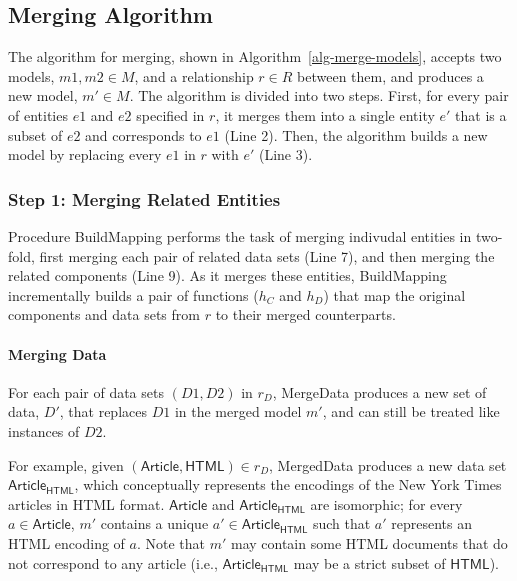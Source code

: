 \subsection{Merging Algorithm}

The algorithm for merging, shown in Algorithm~\ref{alg-merge-models},
accepts two models, $m1, m2 \in M$, and a relationship $r \in R$
between them, and produces a new model, $m' \in M$. The algorithm is
divided into two steps. First, for every pair of entities $e1$ and
$e2$ specified in $r$, it merges them into a single entity $e'$ that is a
subset of $e2$ and corresponds to $e1$ (Line 2). Then, the algorithm
builds a new model by replacing every $e1$ in $r$ with $e'$ (Line 3).


\subsubsection{Step 1: Merging Related Entities}

Procedure \textsf{BuildMapping} performs the task of merging indivudal
entities in two-fold, first merging each pair of related data sets
(Line 7), and then merging the related components (Line 9). As it
merges these entities, \textsf{BuildMapping} incrementally builds a
pair of functions ($h_{C}$ and $h_{D}$) that map the original
components and data sets from $r$ to their merged counterparts.


\paragraph{\textbf{Merging Data}} For each pair of data sets $(D1,
D2)$ in $r_{D}$, \textsf{MergeData} produces a new set of data, $D'$,
that replaces $D1$ in the merged model $m'$, and can still be treated
like instances of $D2$. 

For example, given $(\textsf{Article}, \textsf{HTML}) \in r_{D}$,
\textsf{MergedData} produces a new data set
$\textsf{Article}_{\textsf{HTML}}$, which conceptually represents the
encodings of the New York Times articles in HTML
format. $\textsf{Article}$ and $\textsf{Article}_{\textsf{HTML}}$ are
isomorphic; for every $a \in \textsf{Article}$, $m'$ contains a unique
$a' \in \textsf{Article}_{\textsf{HTML}}$ such that $a'$ represents an
HTML encoding of $a$. Note that $m'$ may contain some HTML documents
that do not correspond to any article (i.e.,
$\textsf{Article}_{\textsf{HTML}}$ may be a strict subset of $\textsf{HTML}$).


